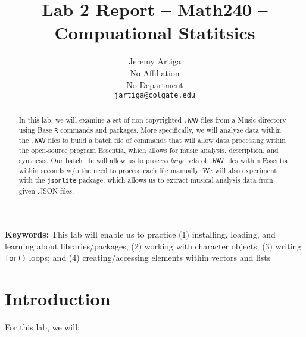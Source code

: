 \documentclass{article}\usepackage[]{graphicx}\usepackage[]{xcolor}
\begin{document}
\vspace{-1in}

\title{Lab 2 Report -- Math240 -- Compuational Statitsics}
\author{
  Jeremy Artiga \\
  No Affiliation \\
  No Department \\
  {\tt{jartiga@colgate.edu}}
}

\date{}

\maketitle

\begin{multicols}{2}
\begin{abstract}
In this lab, we will examine a set of non-copyrighted \texttt{.WAV} files
from a Music directory using Base \texttt{R} commands and packages. More specifically,
we will analyze data within the \texttt{.WAV} files to build a batch file of 
commands that will allow data processing within the open-source program Essentia,
which allows for music analysis, description, and synthesis. Our batch file will
allow us to process \emph{large} sets of \texttt{.WAV} files within Essentia within
seconds w/o the need to process each file manually. We will also experiment with the
\texttt{jsonlite} package, which allows us to extract musical analysis data from
given .JSON files.
\end{abstract}

\textbf{Keywords:} This lab will enable us to practice (1) installing, loading, and learning
about libraries/packages; (2) working with character objects; (3) writing \texttt{for()} loops;
and (4) creating/accessing elements within vectors and lists

\section{Introduction}
For this lab, we will:


\end{multicols}
\end{document}
